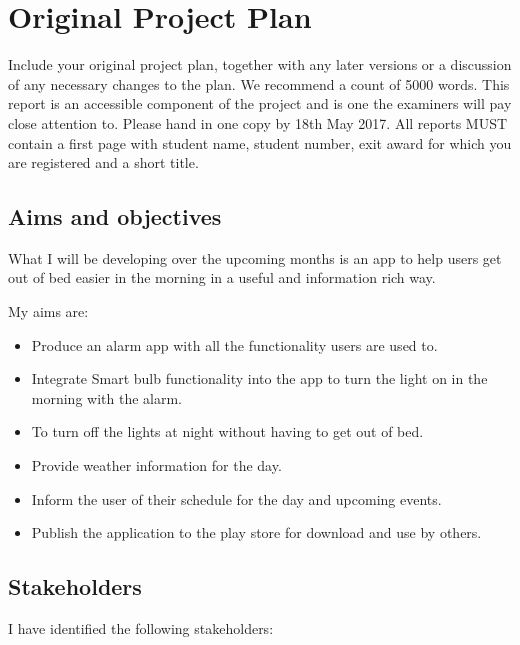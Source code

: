 \section{Original Project Plan}\label{original-project-plan}

Include your original project plan, together with any later versions or
a discussion of any necessary changes to the plan. We recommend a count
of 5000 words. This report is an accessible component of the project and
is one the examiners will pay close attention to. Please hand in one
copy by 18th May 2017. All reports MUST contain a first page with
student name, student number, exit award for which you are registered
and a short title.

\subsection{Aims and objectives}\label{aims-and-objectives}

What I will be developing over the upcoming months is an app to help
users get out of bed easier in the morning in a useful and information
rich way.

My aims are:

\begin{itemize}
\tightlist
\item
  Produce an alarm app with all the functionality users are used to.
\item
  Integrate Smart bulb functionality into the app to turn the light on
  in the morning with the alarm.
\item
  To turn off the lights at night without having to get out of bed.
\item
  Provide weather information for the day.
\item
  Inform the user of their schedule for the day and upcoming events.
\item
  Publish the application to the play store for download and use by
  others.
\end{itemize}

\subsection{Stakeholders}\label{stakeholders}

I have identified the following stakeholders:

